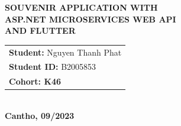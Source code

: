 \begin{titlepage}
\begin{center}
        \textbf{{\Large SOUVENIR APPLICATION WITH\\ASP.NET MICROSERVICES WEB API\\ AND FLUTTER}}
        \\[3.5cm]

        \begin{tabular}{ l l }
            \multicolumn{2}{l}{\textbf{Student:} Nguyen Thanh Phat  }    \\
            \multicolumn{2}{l}{\textbf{Student ID:} B2005853}\\
            \multicolumn{2}{l}{\textbf{Cohort: K46}} \\
        \end{tabular}
        \\[4.5cm]

        \textbf{Cantho, 09/2023}

    \end{center}

\end{titlepage}
